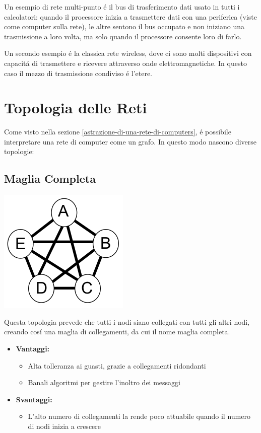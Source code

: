 \documentclass[12pt]{article}
\begin{document}
Un esempio di rete multi-punto \'e il bus di trasferimento dati usato in tutti i calcolatori: quando il processore inizia a 
trasmettere dati con una periferica (viste come computer sulla rete), le altre sentono il bus occupato e non iniziano una 
trasmissione a loro volta, ma solo quando il processore consente loro di farlo.

Un secondo esempio \'e la classica rete wireless, dove ci sono molti dispositivi con capacit\'a di trasmettere e ricevere
attraverso onde elettromagnetiche. In questo caso il mezzo di trasmissione condiviso \'e l'etere.


\section{Topologia delle Reti}\label{topologia-delle-reti}
Come visto nella sezione \ref{astrazione-di-una-rete-di-computers}, \'e possibile interpretare una rete di computer come un 
grafo. In questo modo nascono diverse topologie:

\subsection{Maglia Completa}\label{maglia-completa}
\begin{center}
	\includegraphics[scale=0.5]{introduzione-img4.png}
\end{center}
Questa topologia prevede che tutti i nodi siano collegati con tutti gli altri nodi, creando cos\'i una maglia di collegamenti, da 
cui il nome maglia completa.
\begin{itemize}[noitemsep]
	\item \textbf{Vantaggi:}
	\begin{itemize}[noitemsep]
		\item Alta tolleranza ai guasti, grazie a collegamenti ridondanti
		\item Banali algoritmi per gestire l'inoltro dei messaggi
	\end{itemize}
	\item \textbf{Svantaggi:}
	\begin{itemize}[noitemsep]
		\item L'alto numero di collegamenti la rende poco attuabile quando il numero di nodi inizia a crescere
	\end{itemize}
\end{itemize}
\end{document}
